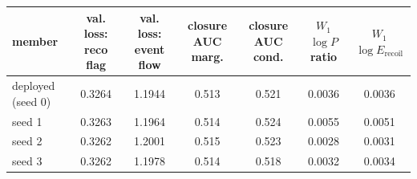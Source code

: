\begin{tabular}{lcccccc}
\toprule
member & val. loss: reco flag & val. loss: event flow & closure AUC marg. & closure AUC cond. & $W_1$ $\log P$ ratio & $W_1$ $\log E_\mathrm{recoil}$ \\
\midrule
deployed (seed 0) & 0.3264 & 1.1944 & 0.513 & 0.521 & 0.0036 & 0.0036 \\
seed 1 & 0.3263 & 1.1964 & 0.514 & 0.524 & 0.0055 & 0.0051 \\
seed 2 & 0.3262 & 1.2001 & 0.515 & 0.523 & 0.0028 & 0.0031 \\
seed 3 & 0.3262 & 1.1978 & 0.514 & 0.518 & 0.0032 & 0.0034 \\
\bottomrule
\end{tabular}
